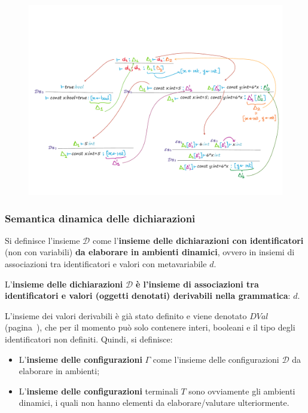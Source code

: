 \documentclass[a4paper]{article}
\begin{document}
	\begin{figure}[!htp]
		\centering
		\includegraphics[width=1.3\textwidth]{img/semantica_statica_dichiarazioni-eg.pdf}
	\end{figure}\newpage
	
	\subsubsection{Semantica dinamica delle dichiarazioni}
	
	Si definisce l'insieme $\mathcal{D}$ come l'\textbf{insieme delle dichiarazioni con identificatori} (non con variabili) \textbf{da elaborare in ambienti dinamici}, ovvero in insiemi di associazioni tra identificatori e valori con metavariabile $d$.
	
	\begin{boxdef}
		L'\textbf{insieme delle dichiarazioni} $\mathcal{D}$ \textbf{è l'insieme di associazioni tra identificatori e valori (oggetti denotati) derivabili nella grammatica}: $d$.
	\end{boxdef}

	\noindent
	L'insieme dei valori derivabili è già stato definito e viene denotato $DVal$ (pagina~\pageref{DVal}), che per il momento può solo contenere interi, booleani e il tipo degli identificatori non definiti. Quindi, si definisce:
	\begin{itemize}
		\item L'\textbf{insieme delle configurazioni} $\Gamma$ come l'insieme delle configurazioni $\mathcal{D}$ da elaborare in ambienti;
		
		\item L'\textbf{insieme delle configurazioni} terminali $T$ sono ovviamente gli ambienti dinamici, i quali non hanno elementi da elaborare/valutare ulteriormente.
	\end{itemize}
	
\end{document}

